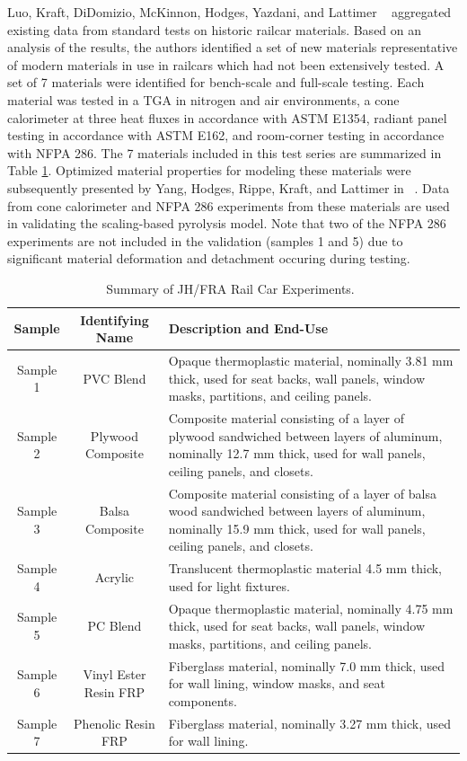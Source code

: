 Luo, Kraft, DiDomizio, McKinnon, Hodges, Yazdani, and Lattimer ~\cite{Luo:FRA2019} aggregated existing data from standard tests on historic railcar materials. 
Based on an analysis of the results, the authors identified a set of new materials representative of modern materials in use in railcars which had not been extensively tested. 
A set of 7 materials were identified for bench-scale and full-scale testing.
Each material was tested in a TGA  in nitrogen and air environments, a cone calorimeter at three heat fluxes in accordance with ASTM E1354, radiant panel testing in accordance with ASTM E162, and room-corner testing in accordance with NFPA 286.
The 7 materials included in this test series are summarized in Table \ref{JH_FRA_materials_table}.
Optimized material properties for modeling these materials were subsequently presented by Yang, Hodges, Rippe, Kraft, and Lattimer in ~\cite{Yang:FRA20}.
Data from cone calorimeter and NFPA 286 experiments from these materials are used in validating the scaling-based pyrolysis model. Note that two of the NFPA 286 experiments are not included in the validation (samples 1 and 5) due to significant material deformation and detachment occuring during testing.

\begin{table}[!htb]
\caption[Summary of JH/FRA Materials]{Summary of JH/FRA Rail Car Experiments.~\cite{Luo:FRA2019}}
\begin{center}
\begin{tabular}{|c|c|p{4in}|}
\hline
Sample & Identifying Name & Description and End-Use \\ \hline \hline
Sample 1    & PVC Blend             & Opaque thermoplastic material, nominally 3.81 mm thick, used for seat backs, wall panels, window masks, partitions, and ceiling panels. \\ \hline
Sample 2    & Plywood Composite     & Composite material consisting of a layer of plywood sandwiched between layers of aluminum, nominally 12.7 mm thick, used for wall panels, ceiling panels, and closets. \\ \hline
Sample 3    & Balsa Composite       & Composite material consisting of a layer of balsa wood sandwiched between layers of aluminum, nominally 15.9 mm thick, used for wall panels, ceiling panels, and closets.  \\ \hline
Sample 4    & Acrylic               & Translucent thermoplastic material 4.5 mm thick, used for light fixtures.  \\ \hline
Sample 5    & PC Blend              & Opaque thermoplastic material, nominally 4.75 mm thick, used for seat backs, wall panels, window masks, partitions, and ceiling panels. \\ \hline
Sample 6    & Vinyl Ester Resin FRP & Fiberglass material, nominally 7.0 mm thick, used for wall lining, window masks, and seat components. \\ \hline
Sample 7    & Phenolic Resin FRP    & Fiberglass material, nominally 3.27 mm thick, used for wall lining. \\ \hline
\end{tabular}
\end{center}
\label{JH_FRA_materials_table}
\end{table}


